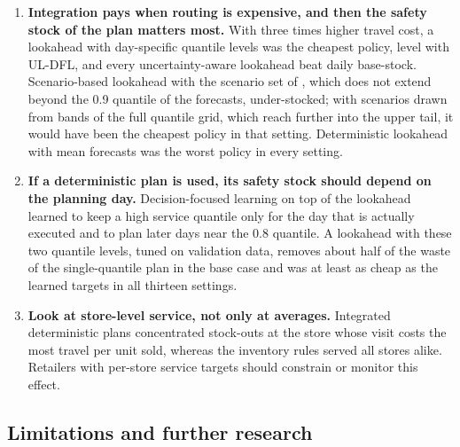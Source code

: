 \begin{enumerate}[leftmargin=*]
\item \textbf{Integration pays when routing is expensive, and then the safety stock of the plan matters most.} With three times higher travel cost, a lookahead with day-specific quantile levels was the cheapest policy, level with UL-DFL, and every uncertainty-aware lookahead beat daily base-stock. Scenario-based lookahead with the scenario set of \citet{jia2025scenario}, which does not extend beyond the 0.9 quantile of the forecasts, under-stocked; with scenarios drawn from bands of the full quantile grid, which reach further into the upper tail, it would have been the cheapest policy in that setting. Deterministic lookahead with mean forecasts was the worst policy in every setting.
\item \textbf{If a deterministic plan is used, its safety stock should depend on the planning day.} Decision-focused learning on top of the lookahead learned to keep a high service quantile only for the day that is actually executed and to plan later days near the 0.8 quantile. A lookahead with these two quantile levels, tuned on validation data, removes about half of the waste of the single-quantile plan in the base case and was at least as cheap as the learned targets in all thirteen settings.
\item \textbf{Look at store-level service, not only at averages.} Integrated deterministic plans concentrated stock-outs at the store whose visit costs the most travel per unit sold, whereas the inventory rules served all stores alike. Retailers with per-store service targets should constrain or monitor this effect.
\end{enumerate}

\subsection{Limitations and further research}

